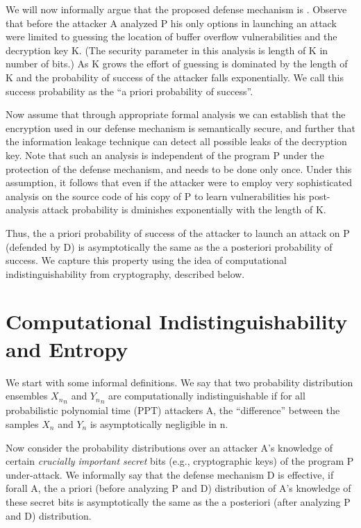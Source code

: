   We will now informally argue that the proposed defense mechanism is
  \resistant. Observe that before the attacker A analyzed P his only
  options in launching an attack were limited to guessing the location
  of buffer overflow vulnerabilities and the decryption key K. (The
  security parameter in this analysis is length of K in number of
  bits.) As K grows the effort of guessing is dominated by the length
  of K and the probability of success of the attacker falls
  exponentially. We call this success probability as the ``a priori
  probability of success''. 

  Now assume that through appropriate formal analysis we can establish
  that the encryption used in our defense mechanism is semantically
  secure, and further that the information leakage technique can
  detect all possible leaks of the decryption key. Note that such an
  analysis is independent of the program P under the protection of the
  defense mechanism, and needs to be done only once. Under this
  assumption, it follows that even if the attacker were to employ very
  sophisticated analysis on the source code of his copy of P to learn
  vulnerabilities his post-analysis attack probability is dminishes
  exponentially with the length of K. 

  Thus, the a priori probability of success of the attacker to launch
  an attack on P (defended by D) is asymptotically the same as the a
  posteriori probability of success. We capture this \resistance
  property using the idea of computational indistinguishability from
  cryptography, described below.

  \section{Computational Indistinguishability and Entropy}

  We start with some informal definitions. We say that two probability
  distribution ensembles ${X_n}_n$ and ${Y_n}_n$ are computationally
  indistinguishable if for all probabilistic polynomial time (PPT)
  attackers A, the ``difference'' between the samples $X_n$ and $Y_n$
  is asymptotically negligible in n.

  Now consider the probability distributions over an attacker A's
  knowledge of certain {\it crucially important secret} bits (e.g.,
  cryptographic keys) of the program P under-attack. We informally say
  that the defense mechanism D is effective, if forall A, the a priori
  (before analyzing P and D) distribution of A's knowledge of these
  secret bits is asymptotically the same as the a posteriori (after
  analyzing P and D) distribution.

